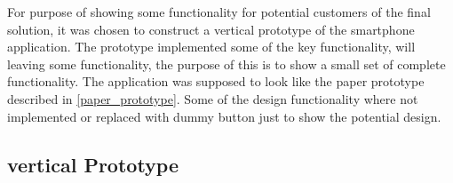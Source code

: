 For purpose of showing some functionality for potential customers of the final solution, it was chosen to construct a vertical prototype of the smartphone application. 
The prototype implemented some of the key functionality, will leaving some functionality, the purpose of this is to show a small set of complete functionality. The application was supposed to look like the paper prototype described in \cref{paper_prototype}. Some of the design functionality where not implemented or replaced with dummy button just to show the potential design.  

\subsection{vertical Prototype}
\label{sub:vertical_prototype}
